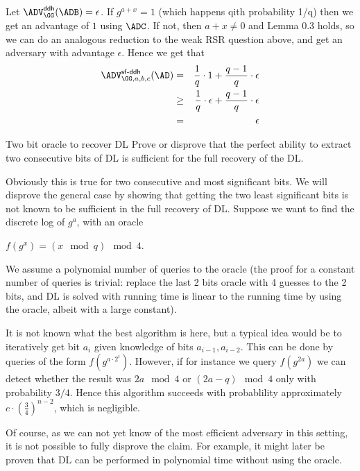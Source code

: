 \documentclass{crypto-exercise}
\begin{document}
\begin{solution}
Let $\ADVDDH{\GG}{\ADB} = \epsilon$.
If $g^{a + x} = 1$ (which happens qith probability 1/q) then we get an advantage of $1$ using $\ADC$. 
If not, then $a + x \neq 0$ and Lemma 0.3 holds, so we can do an analogous reduction to the weak RSR question above, and get an adversary with advantage $\epsilon$.
Hence we get that 
\begin{eqnarray*}
\ADV_{\GG,a,b, c}^{\mathsf{sf\text{-}ddh}}(\AD)
&=& \frac{1}{q} \cdot 1 + \frac{q-1}{q} \cdot \epsilon \\
&\geq& \frac{1}{q} \cdot \epsilon + \frac{q-1}{q} \cdot \epsilon \\
&=& \epsilon
\end{eqnarray*}

\end{solution}

\begin{exercise}{Two bit oracle to recover DL}
Prove or disprove that the perfect ability to extract two consecutive bits of DL is sufficient for the full recovery of the DL.
\end{exercise}
 

\begin{solution} 
Obviously this is true for two consecutive and most significant bits. We will disprove the general case by showing that getting the two least significant bits is not known to be sufficient in the full recovery of DL. 
Suppose we want to find the discrete log of $g^a$, with an oracle 
\begin{center}
$f(g^x) = (x \mod q) \mod 4$.
\end{center}
We assume a polynomial number of queries to the oracle (the proof for a constant number of queries is trivial: replace the last 2 bits oracle with 4 guesses to the 2 bits, and DL is solved with running time is linear to the running time by using the oracle, albeit with a large constant).

It is not known what the best algorithm is here, but  a typical idea would be to iteratively get bit $a_i$ given knowledge of bits $a_{i-1}, a_{i-2}$.
This can be done by queries of the form $f(g^{a \cdot 2^i})$. However, if for instance we query $f(g^{2a})$ we can detect whether the result was $ 2a \mod 4$  or  $(2a  - q) \mod 4$ only with probability $3/4$. Hence this algorithm succeeds with probablility approximately $c \cdot (\frac{3}{4})^{n-2}$, which is negligible.

Of course, as we can not yet know of the most efficient adversary in this setting, it is not possible to fully disprove the claim.
For example, it might later be proven that DL can be performed in polynomial time without using the oracle.

\end{solution}
\end{document}

